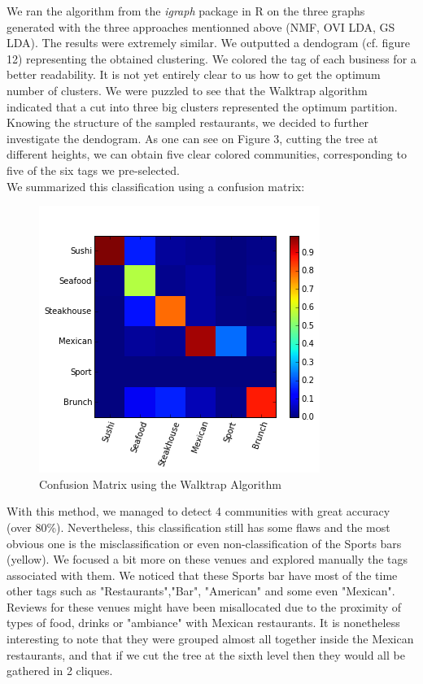 \documentclass[twoside]{article}
\begin{document}
\begin{multicols}{2}
We ran the algorithm from the \emph{igraph} \cite{igr} package in R on the three graphs generated with the three approaches mentionned above (NMF, OVI LDA, GS LDA). The results were extremely similar. We outputted a dendogram (cf. figure 12) representing the obtained clustering. We colored the tag of each business for a better readability.  It is not yet entirely clear to us how to get the optimum number of clusters. We were puzzled to see that the Walktrap algorithm indicated that a cut into three big clusters represented the optimum partition. Knowing the structure of the sampled restaurants, we decided to further investigate the dendogram. As one can see on Figure 3, cutting the tree at different heights, we can obtain five clear colored communities, corresponding to five of the six tags we pre-selected.\\

\noindent We summarized this classification using a confusion matrix: 
\begin{figure}[H]
\centering
\includegraphics[width=1\linewidth]{img/confusion}
\caption{Confusion Matrix using the Walktrap Algorithm}
\end{figure}

\noindent With this method, we managed to detect 4 communities with great accuracy (over 80\%). Nevertheless, this classification still has some flaws and the most obvious one is the misclassification or even non-classification of the Sports bars (yellow). We focused a bit more on these venues and explored manually the tags associated with them. We noticed that these Sports bar have most of the time other tags such as "Restaurants","Bar", "American" and some even "Mexican". Reviews for these venues might have been misallocated due to the proximity of types of food, drinks or "ambiance" with Mexican restaurants. It is nonetheless interesting to note that they were grouped almost all together inside the Mexican restaurants, and that if we cut the tree at the sixth level then they would all be gathered in 2 cliques.\\


\end{multicols}
\end{document}
